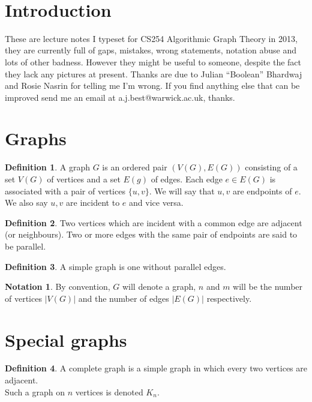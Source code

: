 \documentclass{article}
\theoremstyle{definition}
\newtheorem*{defn}{Definition}
\newtheorem*{nota}{Notation}
\begin{document}
\maketitle
\tableofcontents
~\\
\section*{Introduction}
These are lecture notes I typeset for CS254 Algorithmic Graph Theory in 2013, they are currently full of gaps, mistakes, wrong statements, notation abuse and lots of other badness.
However they might be useful to someone, despite the fact they lack any pictures at present.
Thanks are due to Julian ``Boolean'' Bhardwaj and Rosie Nasrin for telling me I'm wrong.
If you find anything else that can be improved send me an email at a.j.best@warwick.ac.uk, thanks.
\clearpage

\section{Graphs}
\begin{defn}
A graph $G$ is an ordered pair $(V(G),E(G))$ consisting of a set $V(G)$ of vertices and a set $E(g)$ of edges.
Each edge $e\in E(G)$ is associated with a pair of vertices $\{u,v\}$.
We will say that $u,v$ are endpoints of $e$.
We also say $u,v$ are incident to $e$ and vice versa.
\end{defn}

\begin{defn}
Two vertices which are incident with a common edge are adjacent (or neighbours).
Two or more edges with the same pair of endpoints are said to be parallel.
\end{defn}

\begin{defn}
A simple graph is one without parallel edges.
\end{defn}

\begin{nota}
By convention, $G$ will denote a graph, $n$ and $m$ will be the number of vertices $|V(G)|$ and the number of edges $|E(G)|$ respectively.
\end{nota}

\section{Special graphs}
\begin{defn}
A complete graph is a simple graph in which every two vertices are adjacent. \\
Such a graph on $n$ vertices is denoted $K_n$.
\end{defn}
\end{document}
